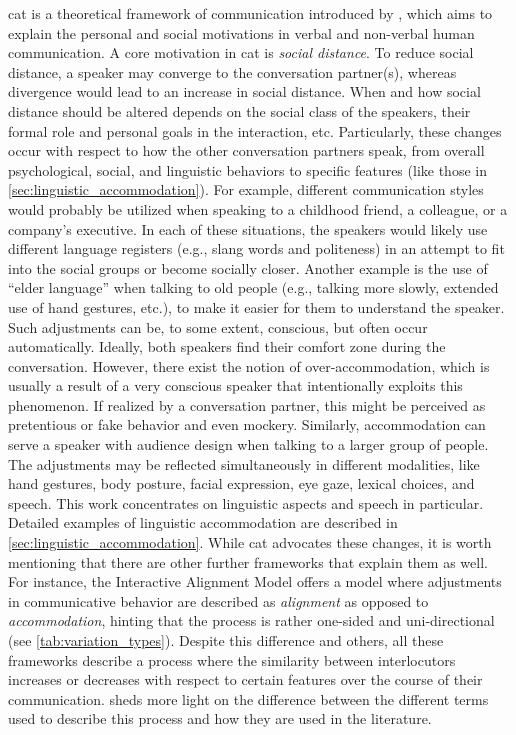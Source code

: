 \Acf{cat} is a theoretical framework of communication introduced by \citet{Giles1973mobility, Giles1991CAT, Giles2007CAT}, which aims to explain the personal and social motivations in verbal and non-verbal human communication.
A core motivation in \ac{cat} is \emph{social distance}.
To reduce social distance, a speaker may converge to the conversation partner(s), whereas divergence would lead to an increase in social distance.
When and how social distance should be altered depends on the social class of the speakers, their formal role and personal goals in the interaction, etc.
Particularly, these changes occur with respect to how the other conversation partners speak, from overall psychological, social, and linguistic behaviors to specific features (like those in \cref{sec:linguistic_accommodation}).
For example, different communication styles would probably be utilized when speaking to a childhood friend, a colleague, or a company's executive.
In each of these situations, the speakers would likely use different language registers (e.g., slang words and politeness) in an attempt to fit into the social groups or become socially closer.
Another example is the use of \enquote{elder language} when talking to old people (e.g., talking more slowly, extended use of hand gestures, etc.), to make it easier for them to understand the speaker.
Such adjustments can be, to some extent, conscious, but often occur automatically.
Ideally, both speakers find their comfort zone during the conversation.
However, there exist the notion of over-accommodation, which is usually a result of a very conscious speaker that intentionally exploits this phenomenon.
If realized by a conversation partner, this might be perceived as pretentious or fake behavior and even mockery.
Similarly, accommodation can serve a speaker with audience design when talking to a larger group of people.
The adjustments may be reflected simultaneously in different modalities, like hand gestures, body posture, facial expression, eye gaze, lexical choices, and speech.
This work concentrates on linguistic aspects and speech in particular.
Detailed examples of linguistic accommodation are described in \cref{sec:linguistic_accommodation}.
While \ac{cat} advocates these changes, it is worth mentioning that there are other further frameworks that explain them as well.
For instance, the Interactive Alignment Model \citep{Pickering2004behavioral, Pickering2013integrated} offers a model where adjustments in communicative behavior are described as \emph{alignment} as opposed to \emph{accommodation}, hinting that the process is rather one-sided and uni-directional (see \cref{tab:variation_types}).
Despite this difference and others, all these frameworks describe a process where the similarity between interlocutors increases or decreases with respect to certain features over the course of their communication.
 sheds more light on the difference between the different terms used to describe this process and how they are used in the literature.

